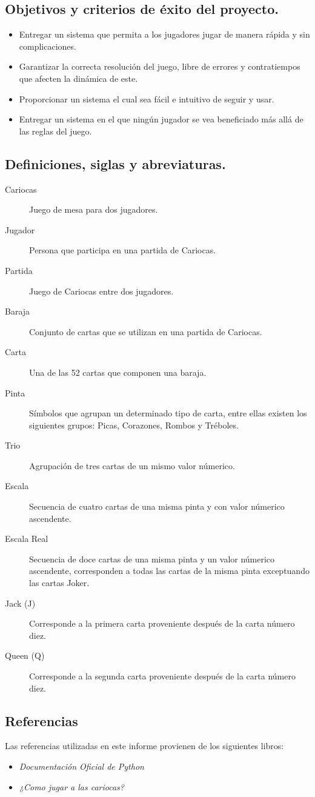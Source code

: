 \subsection{Objetivos y criterios de éxito del proyecto.}\label{cap:objetivos}
\begin{itemize}
    \item Entregar un sistema que permita a los jugadores jugar de manera rápida y sin complicaciones.
    \item Garantizar la correcta resolución del juego, libre de errores y contratiempos que afecten la dinámica de este.
    \item Proporcionar un sistema el cual sea fácil e intuitivo de seguir y usar.
    \item Entregar un sistema en el que ningún jugador se vea beneficiado más allá de las reglas del juego.
\end{itemize}


\subsection{Definiciones, siglas y abreviaturas.}\label{cap:definiciones}
\begin{description}
    \item[Cariocas] Juego de mesa para dos jugadores.
    \item[Jugador] Persona que participa en una partida de Cariocas.
    \item[Partida] Juego de Cariocas entre dos jugadores.
    \item[Baraja] Conjunto de cartas que se utilizan en una partida de Cariocas.
    \item[Carta] Una de las 52 cartas que componen una baraja.
    \item[Pinta] Símbolos que agrupan un determinado tipo de carta, entre ellas existen los siguientes grupos: Picas, Corazones, Rombos y Tréboles.
    \item[Trio] Agrupación de tres cartas de un mismo valor númerico.
    \item[Escala] Secuencia de cuatro cartas de una misma pinta y con valor númerico ascendente.
    \item[Escala Real] Secuencia de doce cartas de una misma pinta y un valor númerico ascendente, corresponden a todas las cartas de la misma pinta exceptuando las cartas Joker.
    \item[Jack (J)] Corresponde a la primera carta proveniente después de la carta número diez.
    \item[Queen (Q)] Corresponde a la segunda carta proveniente después de la carta número diez.
\end{description}

\subsection{Referencias}
Las referencias utilizadas en este informe provienen de los siguientes libros:
\begin{itemize}
    \item \textit{Documentación Oficial de Python} \cite{python}
    \item \textit{¿Como jugar a las cariocas?} \cite{cariocas}
\end{itemize}